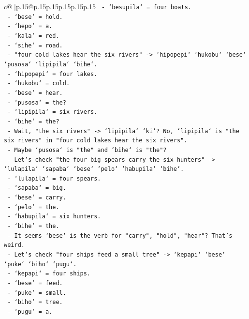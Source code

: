\documentclass{article}
\begin{document}
{\begin{supertabular}{c@{$\;$}|p{.15\linewidth}@{}p{.15\linewidth}p{.15\linewidth}p{.15\linewidth}p{.15\linewidth}p{.15\linewidth}}
{{{\texttt{      {-} `besupila` = four boats.} \\
\texttt{      {-} `bese` = hold.} \\
\texttt{      {-} `hepo` = a.} \\
\texttt{      {-} `kala` = red.} \\
\texttt{      {-} `sihe` = road.} \\
\texttt{    {-} "four cold lakes hear the six rivers" {-}> `hipopepi` `hukobu` `bese` `pusosa` `lipipila` `bihe`.} \\
\texttt{      {-} `hipopepi` = four lakes.} \\
\texttt{      {-} `hukobu` = cold.} \\
\texttt{      {-} `bese` = hear.} \\
\texttt{      {-} `pusosa` = the?} \\
\texttt{      {-} `lipipila` = six rivers.} \\
\texttt{      {-} `bihe` = the?} \\
\texttt{    {-} Wait, "the six rivers" {-}> `lipipila` `ki`? No, `lipipila` is "the six rivers" in "four cold lakes hear the six rivers".} \\
\texttt{    {-} Maybe `pusosa` is "the" and `bihe` is "the"?} \\
\texttt{    {-} Let's check "the four big spears carry the six hunters" {-}> `lulapila` `sapaba` `bese` `pelo` `habupila` `bihe`.} \\
\texttt{      {-} `lulapila` = four spears.} \\
\texttt{      {-} `sapaba` = big.} \\
\texttt{      {-} `bese` = carry.} \\
\texttt{      {-} `pelo` = the.} \\
\texttt{      {-} `habupila` = six hunters.} \\
\texttt{      {-} `bihe` = the.} \\
\texttt{    {-} It seems `bese` is the verb for "carry", "hold", "hear"? That's weird.} \\
\texttt{    {-} Let's check "four ships feed a small tree" {-}> `kepapi` `bese` `puke` `biho` `pugu`.} \\
\texttt{      {-} `kepapi` = four ships.} \\
\texttt{      {-} `bese` = feed.} \\
\texttt{      {-} `puke` = small.} \\
\texttt{      {-} `biho` = tree.} \\
\texttt{      {-} `pugu` = a.} \\
}}}
\end{supertabular}}
\end{document}
